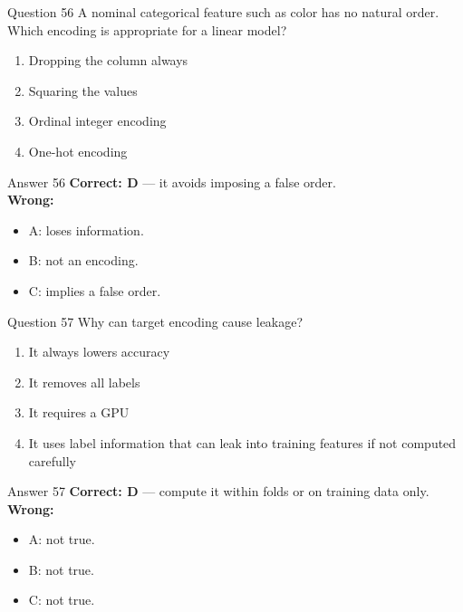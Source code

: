 \documentclass[aspectratio=169,11pt]{beamer}
\begin{document}
\begin{frame}{Question 56}
A nominal categorical feature such as color has no natural order. Which encoding is appropriate for a linear model?
\begin{enumerate}[label=\Alph*.]
\item Dropping the column always
\item Squaring the values
\item Ordinal integer encoding
\item One-hot encoding
\end{enumerate}
\end{frame}
\begin{frame}{Answer 56}
\textbf{Correct: D} --- it avoids imposing a false order.\\
\vspace{0.5em}
\textbf{Wrong:}
\begin{itemize}
\item A: loses information.
\item B: not an encoding.
\item C: implies a false order.
\end{itemize}
\end{frame}

\begin{frame}{Question 57}
Why can target encoding cause leakage?
\begin{enumerate}[label=\Alph*.]
\item It always lowers accuracy
\item It removes all labels
\item It requires a GPU
\item It uses label information that can leak into training features if not computed carefully
\end{enumerate}
\end{frame}
\begin{frame}{Answer 57}
\textbf{Correct: D} --- compute it within folds or on training data only.\\
\vspace{0.5em}
\textbf{Wrong:}
\begin{itemize}
\item A: not true.
\item B: not true.
\item C: not true.
\end{itemize}
\end{frame}
\end{document}
